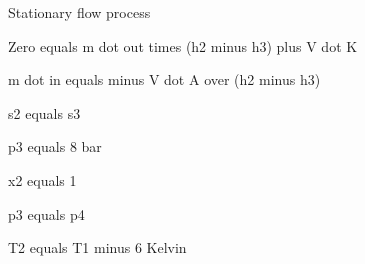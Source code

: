 Stationary flow process

Zero equals m dot out times (h2 minus h3) plus V dot K

m dot in equals minus V dot A over (h2 minus h3)

s2 equals s3

p3 equals 8 bar

x2 equals 1

p3 equals p4

T2 equals T1 minus 6 Kelvin